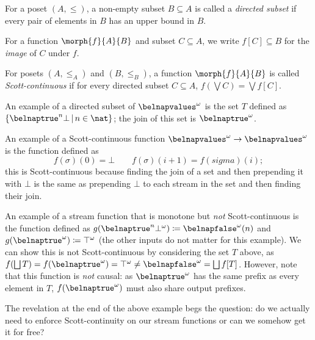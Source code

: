 \begin{definition}
    For a poset \((A, \leq)\), a non-empty subset \(B \subseteq A\) is called a
    \emph{directed subset} if every pair of elements in \(B\) has an upper bound
    in \(B\).
\end{definition}

\begin{notation}[Image]
    For a function \(\morph{f}{A}{B}\) and subset \(C \subseteq A\), we write
    \(f[C] \subseteq B\) for the \emph{image} of \(C\) under \(f\).
\end{notation}

\begin{definition}
    For posets \((A, \leq_A)\) and \((B, \leq_B)\), a function
    \(\morph{f}{A}{B}\) is called \emph{Scott-continuous} if for every directed
    subset \(C \subseteq A\), \(f(\bigvee C) = \bigvee f[C]\).
\end{definition}

\begin{example}\label{ex:directed-subsets}
    An example of a directed subset of \(\belnapvalues^\omega\) is the set \(T\)
    defined as \(\{\belnaptrue^n\bot \,|\, n \in \nat\}\); the join of this set
    is \(\belnaptrue^\omega\).

    An example of a Scott-continuous function \(
    \belnapvalues^\omega \to \belnapvalues^\omega
    \) is the function defined as \[
        f(\sigma)(0) = \bot \qquad f(\sigma)(i+1) = f(sigma)(i);
    \] this is Scott-continuous because finding the join of a set and then
    prepending it with \(\bot\) is the same as prepending \(\bot\) to each
    stream in the set and then finding their join.

    An example of a stream function that is monotone but \emph{not}
    Scott-continuous is the function defined as \(
    g(\belnaptrue^n\bot^\omega) \coloneqq \belnapfalse^\omega (n )
    \) and \(g(\belnaptrue^\omega) \coloneqq \top^\omega\) (the other inputs
    do not matter for this example).
    We can show this is not Scott-continuous by considering the set \(T\) above,
    as \(f(\bigsqcup T) = f(\belnaptrue^\omega) = \top^\omega \neq
    \belnapfalse^\omega = \bigsqcup f[T]
    \).
    However, note that this function is \emph{not} causal: as
    \(\belnaptrue^\omega\) has the same prefix as every element in \(T\),
    \(f(\belnaptrue^\omega)\) must also share output prefixes.
\end{example}

The revelation at the end of the above example begs the question: do we actually
need to enforce Scott-continuity on our stream functions or can we somehow get
it for free?

